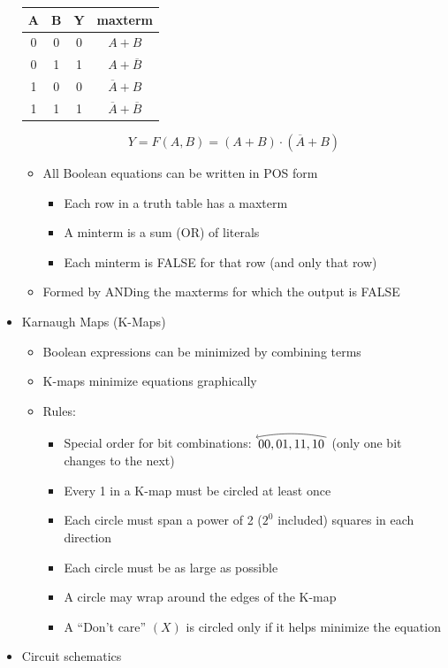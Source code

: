 \documentclass[a4paper]{article}
\begin{document}
\begin{itemize}
\begin{center}
\begin{tabular}{c c|c|c}
A&B&Y&maxterm\\\hline
0&0&0&$A+B$\\
0&1&1&$A+\overline{B}$\\
1&0&0&$\overline{A}+B$\\
1&1&1&$\overline{A}+\overline{B}$
\end{tabular}
$$Y=F(A,B)=(A+B)\cdot (\overline{A}+B)$$
\end{center}
\begin{itemize}
\item All Boolean equations can be written in POS form
\begin{itemize}
\item Each row in a truth table has a maxterm
\item A minterm is a sum (OR) of literals
\item Each minterm is FALSE for that row (and only that row)
\end{itemize}
\item Formed by ANDing the maxterms for which the output is FALSE
\end{itemize}
\item Karnaugh Maps (K-Maps)
\begin{itemize}
\item Boolean expressions can be minimized by combining terms
\item K-maps minimize equations graphically
\item Rules:
\begin{itemize}
\item Special order for bit combinations: $\mathop {00,01,11,10}\limits^{
\begin{tikzpicture}
\draw[<-] (0,0) parabola bend (1,0.1) (2,0);
\end{tikzpicture}
}$ (only one bit changes to the next)
\item Every 1 in a K-map must be circled at least once
\item Each circle must span a power of 2 ($2^0$ included) squares in each direction 
\item Each circle must be as large as possible
\item A circle may wrap around the edges of the K-map
\item A ``Don't care'' $(X)$ is circled only if it helps minimize the equation
\end{itemize}
\end{itemize}
\item Circuit schematics 

\end{itemize}
\end{document}
